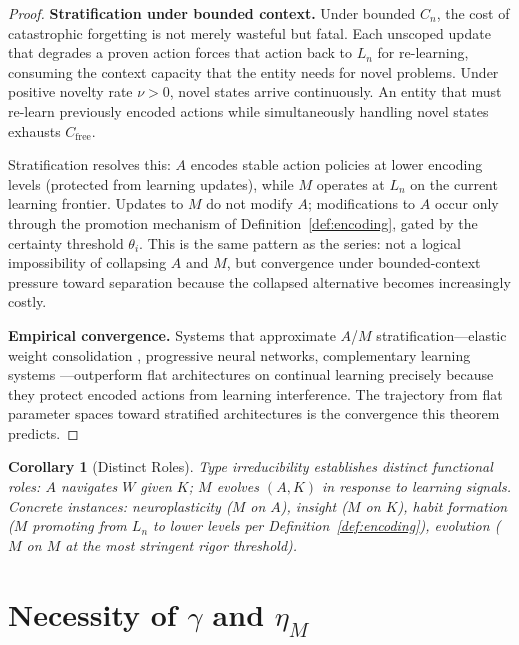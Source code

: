 \documentclass[11pt]{article}
\newtheorem{corollary}[theorem]{Corollary}
\theoremstyle{definition}
\theoremstyle{remark}
\begin{document}
\begin{proof}
\textbf{Stratification under bounded context.}
Under bounded $C_n$, the cost of catastrophic forgetting is not merely
wasteful but fatal. Each unscoped update that degrades a proven action
forces that action back to $L_n$ for re-learning, consuming the
context capacity that the entity needs for novel problems. Under
positive novelty rate $\nu > 0$, novel states arrive continuously.
An entity that must re-learn previously encoded actions while
simultaneously handling novel states exhausts $C_{\mathrm{free}}$.

Stratification resolves this: $A$ encodes stable action policies at
lower encoding levels (protected from learning updates), while $M$
operates at $L_n$ on the current learning frontier. Updates to $M$
do not modify $A$; modifications to $A$ occur only through the
promotion mechanism of Definition~\ref{def:encoding}, gated by the
certainty threshold $\theta_i$. This is the same pattern as the
series: not a logical impossibility of collapsing $A$ and $M$, but
convergence under bounded-context pressure toward separation because
the collapsed alternative becomes increasingly costly.

\textbf{Empirical convergence.}
Systems that approximate $A$/$M$ stratification---elastic weight
consolidation \cite{Kirkpatrick2017}, progressive neural networks,
complementary learning systems \cite{McClelland1995}---outperform
flat architectures on continual learning precisely because they
protect encoded actions from learning interference. The trajectory
from flat parameter spaces toward stratified architectures is
the convergence this theorem predicts.
\end{proof}

\begin{corollary}[Distinct Roles]
\label{cor:roles}
Type irreducibility establishes distinct functional roles:
$A$ navigates $W$ given $K$; $M$ evolves $(A, K)$ in response to
learning signals. Concrete instances: neuroplasticity ($M$ on $A$),
insight ($M$ on $K$), habit formation ($M$ promoting from $L_n$ to
lower levels per Definition~\ref{def:encoding}), evolution ($M$ on $M$
at the most stringent rigor threshold).
\end{corollary}

\section{Necessity of $\gamma$ and $\eta_M$}
\label{sec:necessity}
\end{document}
